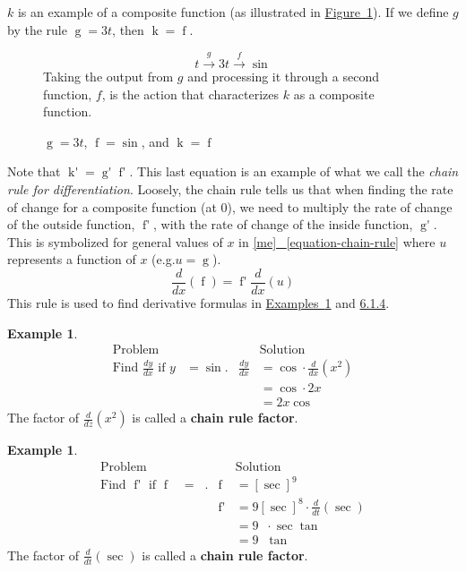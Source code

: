 \documentclass[12pt,]{book}
\newcommand{\terminology}[1]{\textbf{#1}}
\theoremstyle{plain}
\theoremstyle{definition}
\newtheorem{example}[theorem]{Example}
\numberwithin{equation}{section}
\newcommand{\fe}[2]{\mathop{{#1}{\left(#2\right)}}}
\newcommand{\fd}[1]{#1'}
\newcommand{\lz}[2]{\frac{d#1}{d#2}}
\newcommand{\lzoo}[2]{{\frac{d}{d#1}}{\left(#2\right)}}
\begin{document}
\(k\) is an example of a composite function (as illustrated in \hyperref[figure-composite-function]{Figure~\ref*{figure-composite-function}}).  If we define \(g\) by the rule \(\fe{g}{t}=3t\), then \(\fe{k}{t}=\fe{f}{\fe{g}{t}}\).%
\begin{figure}
\centering
\[t\xrightarrow{g}3t\xrightarrow{f}\fe{\sin}{3t}\]Taking the output from \(g\) and processing it through a second function, \(f\), is the action that characterizes \(k\) as a composite function.%
\caption{\(\fe{g}{t}=3t\), \(\fe{f}{u}=\fe{\sin}{u}\), and \(\fe{k}{t}=\fe{f}{\fe{g}{t}}\)\label{figure-composite-function}}
\end{figure}
\par
Note that \(\fe{\fd{k}}{0}=\fe{\fd{g}}{0}\fe{\fd{f}}{\fe{g}{0}}\).  This last equation is an example of what we call the \emph{chain rule for differentiation}. Loosely, the chain rule tells us that when finding the rate of change for a composite function (at \(0\)), we need to multiply the rate of change of the outside function, \(\fe{\fd{f}}{\fe{g}{0}}\), with the rate of change of the inside function, \(\fe{\fd{g}}{0}\).  This is symbolized for general values of \(x\) in \hyperref[equation-chain-rule]{[me]
~\ref*{equation-chain-rule}} where \(u\) represents a function of \(x\) (e.g.\@ \(u=\fe{g}{x}\)). \[\lzoo{x}{\fe{f}{u}}=\fe{\fd{f}}{u}\lzoo{x}{u}\]This rule is used to find derivative formulas in \hyperref[example-chain-rule]{Examples~\ref*{example-chain-rule}} and \hyperref[example-second-chain-rule]{6.1.4}.%
\begin{example}\label{example-chain-rule}
\begin{align*}
\text{Problem}&&&\text{Solution}\\
\text{Find }\lz{y}{x}\text{ if }y&=\fe{\sin}{x^2}\text{.}&\lz{y}{x}&=\fe{\cos}{x^2}\cdot\lzoo{x}{x^2}\\
&&&=\fe{\cos}{x^2}\cdot2x\\
&&&=2x\fe{\cos}{x^2}
\end{align*}The factor of \(\lzoo{z}{x^2}\) is called a \terminology{chain rule factor}.%
\end{example}
\begin{example}\label{example-second-chain-rule}
\begin{align*}
\text{Problem}&&&\text{Solution}\\
\text{Find }\fe{\fd{f}}{t}\text{ if }\fe{f}{t}&=\fe{\sec^9}{t}\text{.}&\fe{f}{t}&=\left[\fe{\sec}{t}\right]^9\\
&&\fe{\fd{f}}{t}&=9\left[\fe{\sec}{t}\right]^8\cdot\lzoo{t}{\fe{\sec}{t}}\\
&&&=9\fe{\sec^8}{t}\cdot\fe{\sec}{t}\fe{\tan}{t}\\
&&&=9\fe{\sec^9}{t}\fe{\tan}{t}
\end{align*}The factor of \(\lzoo{t}{\fe{\sec}{t}}\) is called a \terminology{chain rule factor}.%
\end{example}
\end{document}
